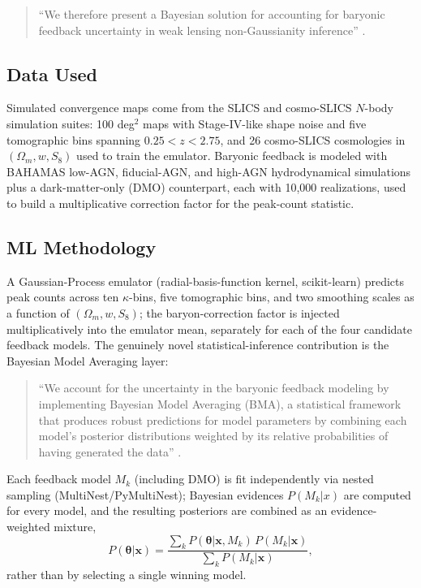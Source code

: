 \documentclass[11pt]{article}
\begin{document}
\begin{quote}
\enquote{We therefore present a Bayesian solution for accounting for baryonic feedback uncertainty in weak lensing non-Gaussianity inference} \citep[p.~1]{grandon2024bma}.
\end{quote}

\subsection{Data Used}
Simulated convergence maps come from the SLICS and cosmo-SLICS $N$-body simulation suites: 100 deg$^2$ maps with Stage-IV-like shape noise and five tomographic bins spanning $0.25<z<2.75$, and 26 cosmo-SLICS cosmologies in $(\Omega_m, w, S_8)$ used to train the emulator. Baryonic feedback is modeled with BAHAMAS low-AGN, fiducial-AGN, and high-AGN hydrodynamical simulations plus a dark-matter-only (DMO) counterpart, each with 10{,}000 realizations, used to build a multiplicative correction factor for the peak-count statistic.

\subsection{ML Methodology}
A Gaussian-Process emulator (radial-basis-function kernel, scikit-learn) predicts peak counts across ten $\kappa$-bins, five tomographic bins, and two smoothing scales as a function of $(\Omega_m, w, S_8)$; the baryon-correction factor is injected multiplicatively into the emulator mean, separately for each of the four candidate feedback models. The genuinely novel statistical-inference contribution is the Bayesian Model Averaging layer:

\begin{quote}
\enquote{We account for the uncertainty in the baryonic feedback modeling by implementing Bayesian Model Averaging (BMA), a statistical framework that produces robust predictions for model parameters by combining each model's posterior distributions weighted by its relative probabilities of having generated the data} \citep[p.~3]{grandon2024bma}.
\end{quote}

\noindent Each feedback model $M_k$ (including DMO) is fit independently via nested sampling (MultiNest/PyMultiNest); Bayesian evidences $P(M_k|x)$ are computed for every model, and the resulting posteriors are combined as an evidence-weighted mixture,
\begin{equation}
P(\boldsymbol\theta|\boldsymbol x) = \frac{\sum_k P(\boldsymbol\theta|\boldsymbol x, M_k)\,P(M_k|\boldsymbol x)}{\sum_k P(M_k|\boldsymbol x)},
\end{equation}
rather than by selecting a single winning model.
\end{document}
